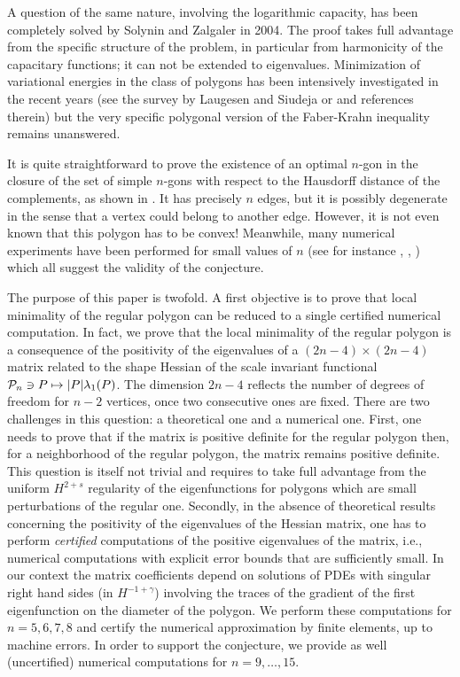 \documentclass[11pt]{article}
\newcommand{\ie}{i.e.,\xspace}
\numberwithin{equation}{section}\newtheorem*{jepEnonce}{\jepEnonceTitle}\newenvironment{enonce*}[1]{\def\jepEnonceTitle{#1}\jepEnonce}{\endjepEnonce}\newtheorem*{conj*}{Conjecture}
\def\mto{\mathchoice{\longmapsto}{\mapsto}{\mapsto}{\mapsto}}
\theoremstyle{plain}
\theoremstyle{definition}
\newcommand{\lb}{\lambda}
\begin{document}
A question of the same nature, involving the logarithmic capacity, has been completely solved by Solynin and Zalgaler \cite{SoZa04} in 2004. The proof takes full advantage from the specific structure of the problem, in particular from harmonicity of the capa\-citary functions; it can not be extended to eigenvalues. Minimization of variational energies in the class of polygons has been intensively investigated in the recent years (see the survey by Laugesen and Siudeja \cite{LaSi17} or \cite{BuFr21} and references therein) but the very specific polygonal version of the Faber-Krahn inequality remains unanswered.

It is quite straightforward to prove the existence of an optimal $n$-gon in the closure of the set of simple $n$-gons with respect to the Hausdorff distance of the complements, as shown in \cite[Ch.\,3]{henroteigs}. It has precisely $n$ edges, but it is possibly degenerate in the sense that a vertex could belong to another edge. However, it is not even known that this polygon has to be convex! Meanwhile, many numerical experiments have been performed for small values of $n$ (see for instance \cite{AFpolygons}, \cite[Ch.\,1]{beniphd}, \cite{nigam_numerics}) which all suggest the validity of the conjecture.

The purpose of this paper is twofold. A first objective is to prove that local minimality of the regular polygon can be reduced to a single certified numerical computation.
In fact, we prove that the local minimality of the regular polygon is a consequence of the positivity of the eigenvalues of a $(2n-4) \times (2n-4)$ matrix related to the shape Hessian of the scale invariant functional ${\mathcal P}_n \ni P \mto |P|\lb_1(P)$. The dimension $2n-4$ reflects the number of degrees of freedom for $n-2$ vertices, once two consecutive ones are fixed. There are two challenges in this question: a theoretical one and a numerical one. First, one needs to prove that if the matrix is positive definite for the regular polygon then, for a neighborhood of the regular polygon, the matrix remains positive definite. This question is itself not trivial and requires to take full advantage from the uniform $H^{2+s}$ regularity of the eigenfunctions for polygons which are small perturbations of the regular one. Secondly, in the absence of theoretical results concerning the positivity of the eigenvalues of the Hessian matrix, one has to perform {\it certified} computations of the positive eigenvalues of the matrix, \ie numerical computations with explicit error bounds that are sufficiently small. In our context the matrix coefficients depend on solutions of PDEs with singular right hand sides (in $H^{-1+ \gamma}$) involving the traces of the gradient of the first eigenfunction on the diameter of the polygon. We perform these computations for $n= 5, 6, 7, 8$ and certify the numerical approximation by finite elements, up to machine errors. In order to support the conjecture, we provide as well (uncertified) numerical computations for $n=9, \dots, 15$.
\end{document}
